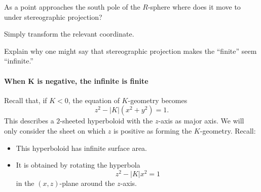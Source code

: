 \documentclass[hints,handout,12pt,noauthor,nooutcomes]{ximera}
\begin{document}
\begin{problem}
  As a point approaches the south pole of the $R$-sphere where does it
  move to under stereographic projection?
  \begin{hint}
    Simply transform the relevant coordinate.
  \end{hint}
  \begin{freeResponse}
  \end{freeResponse}
\end{problem}



\begin{problem}
  Explain why one might say that stereographic projection makes the
  ``finite'' seem ``infinite.''
    \begin{freeResponse}
    \end{freeResponse}
\end{problem}




\paragraph{When $\boldsymbol K$ is negative, the infinite is finite}


Recall that, if $K<0$, the equation of $K$-geometry becomes
\[
z^{2}-|K|(x^{2}+y^{2})=1.
\]
This describes a $2$-sheeted hyperboloid with the $z$-axis as major axis.  We
will only consider the sheet on which $z$ is positive as forming the
$K$-geometry.  Recall:

\begin{itemize}
\item This hyperboloid has infinite surface area.
\item It is obtained by rotating the hyperbola
  \[z^{2}-\left\vert K\right\vert x^{2}=1\]
  in the $(x,z)$-plane around the $z$-axis.
\end{itemize}
\end{document}
